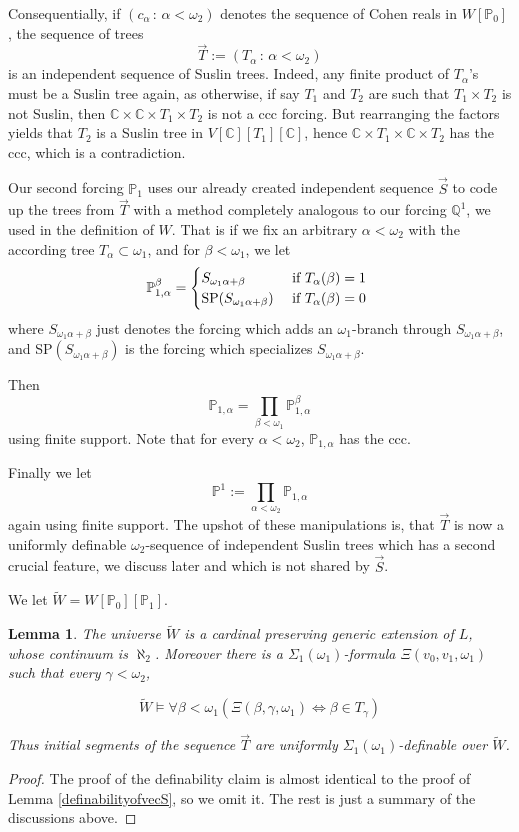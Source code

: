 \documentclass[a4paper,12pt]{article}
\newtheorem{lemma}[theorem]{Lemma}
\newcommand{\forceP}{\mathbb{P}}
\newcommand{\forceQ}{\mathbb{Q}}
\begin{document}
 Consequentially, if $(c_{\alpha} \, : \, \alpha < \omega_2)$ denotes the sequence of Cohen reals in $W[\forceP_0]$, the sequence of trees 
 \[\vec{T}:=(T_{\alpha} \, : \, \alpha < \omega_2) \]
 is an independent sequence of Suslin trees. Indeed, any finite product of $T_{\alpha}$'s must be a Suslin tree again, as otherwise, if say $T_1$ and $T_2$ are such that $T_1 \times T_2$ is not Suslin, then $\mathbb{C} \times \mathbb{C} \times T_1 \times T_2$ is not a ccc forcing. But rearranging the factors yields that $T_2$ is a Suslin tree in $V[\mathbb{C}][T_1][\mathbb{C}]$, hence $\mathbb{C} \times T_1 \times \mathbb{C} \times T_2$ has the ccc, which is a contradiction.
 
 Our second forcing $\forceP_1$ uses our already created independent sequence $\vec{S}$ to code up the trees from $\vec{T}$ with a method completely analogous to our forcing $\forceQ^1$, we used in the definition of $W$. That is if we fix an arbitrary $\alpha < \omega_2$ with the according tree $T_{\alpha} \subset \omega_1$, 
and for $\beta < \omega_1$, we let
 \[ \forceP^{\beta}_{1,\alpha}= \begin{cases} S_{ \omega_1 \alpha + \beta} & \text{ if $T_{\alpha} (\beta)=1$ }
 \\
 \hbox{SP} (S_{\omega_1 \alpha+\beta}) & \text{ if $T_{\alpha} (\beta) =0$ }
 \end{cases} \]
where $S_{ \omega_1 \alpha + \beta}$ just denotes the forcing which adds an $\omega_1$-branch through $S_{ \omega_1 \alpha + \beta}$, and SP$(S_{ \omega_1 \alpha + \beta})$ is the forcing which specializes $S_{ \omega_1 \alpha + \beta}$.

Then
\[ \forceP_{1,\alpha} = \prod_{\beta < \omega_1} \forceP^{\beta}_{1,\alpha} \] using finite support. Note that for every $\alpha < \omega_2$, $\forceP_{1,\alpha}$ has the ccc.

Finally we let
\[ \forceP^1 := \prod_{\alpha < \omega_2} \forceP_{1,\alpha} \]
again using finite support. The upshot of these manipulations is, that $\vec{T}$ is now a uniformly definable $\omega_2$-sequence of independent Suslin trees which has a second crucial feature, we discuss later and which is not shared by $\vec{S}$.

We let $\tilde{W}= W[\forceP_0][\forceP_1]$.

\begin{lemma}\label{definabilityofvecT}
The universe $\tilde{W}$ is a cardinal preserving generic extension of $L$, whose continuum is $\aleph_2$. Moreover
there is a $\Sigma_1(\omega_1)$-formula $\Xi(v_0,v_1,\omega_1)$ such that every $\gamma < \omega_2$,

\[ \tilde{W} \models \forall \beta < \omega_1 (\Xi (\beta, \gamma,\omega_1) \Leftrightarrow \beta \in T_{\gamma}) \]
 
Thus initial segments  of the sequence $\vec{T} $ are uniformly  $\Sigma_1(\omega_1)$-definable over $\tilde{W}$.
\end{lemma}
\begin{proof}
The proof of the definability claim is almost identical to the proof of Lemma \ref{definabilityofvecS}, so we omit it. The rest is just a summary of the discussions above.
\end{proof}
\end{document}
